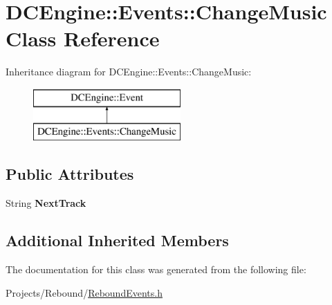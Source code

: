 \hypertarget{classDCEngine_1_1Events_1_1ChangeMusic}{\section{D\-C\-Engine\-:\-:Events\-:\-:Change\-Music Class Reference}
\label{classDCEngine_1_1Events_1_1ChangeMusic}
}
Inheritance diagram for D\-C\-Engine\-:\-:Events\-:\-:Change\-Music\-:\begin{figure}[H]
\begin{center}
\leavevmode
\includegraphics[height=2.000000cm]{classDCEngine_1_1Events_1_1ChangeMusic}
\end{center}
\end{figure}
\subsection*{Public Attributes}
\begin{DoxyCompactItemize}
\item 
\hypertarget{classDCEngine_1_1Events_1_1ChangeMusic_aa76e424e9382ce2713ac02ed9870a64d}{String {\bfseries Next\-Track}}\label{classDCEngine_1_1Events_1_1ChangeMusic_aa76e424e9382ce2713ac02ed9870a64d}

\end{DoxyCompactItemize}
\subsection*{Additional Inherited Members}


The documentation for this class was generated from the following file\-:\begin{DoxyCompactItemize}
\item 
Projects/\-Rebound/\hyperlink{ReboundEvents_8h}{Rebound\-Events.\-h}\end{DoxyCompactItemize}
